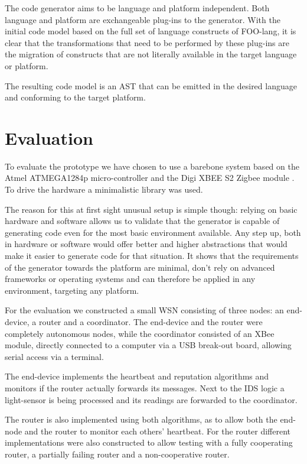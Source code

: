 \documentclass[conference]{IEEEtran}
\begin{document}
The code generator aims to be language and platform independent. Both language
and platform are exchangeable plug-ins to the generator. With the initial code
model based on the full set of language constructs of FOO-lang, it is clear
that the transformations that need to be performed by these plug-ins are the
migration of constructs that are not literally available in the target language
or platform.

The resulting code model is an AST that can be emitted in the desired language
and conforming to the target platform.

\section{Evaluation}
\label{section:evaluation}

To evaluate the prototype we have chosen to use a barebone system based on the
Atmel ATMEGA1284p micro-controller \cite{datasheet:atmega1284p} and the Digi
XBEE S2 Zigbee module \cite{datasheet:xbee}. To drive the hardware a
minimalistic library was used.

The reason for this at first sight unusual setup is simple though: relying on
basic hardware and software allows us to validate that the generator is capable
of generating code even for the most basic environment available. Any step up,
both in hardware or software would offer better and higher abstractions that
would make it easier to generate code for that situation. It shows that the
requirements of the generator towards the platform are minimal, don't rely on
advanced frameworks or operating systems and can therefore be applied in any
environment, targeting any platform.

For the evaluation we constructed a small WSN consisting of three nodes: an
end-device, a router and a coordinator. The end-device and the router were
completely autonomous nodes, while the coordinator consisted of an XBee module,
directly connected to a computer via a USB break-out board, allowing serial
access via a terminal.

The end-device implements the heartbeat and reputation algorithms and monitors
if the router actually forwards its messages. Next to the IDS logic a
light-sensor is being processed and its readings are forwarded to the
coordinator.

The router is also implemented using both algorithms, as to allow both the
end-node and the router to monitor each others' heartbeat. For the router
different implementations were also constructed to allow testing with a fully
cooperating router, a partially failing router and a non-cooperative router.
\end{document}
